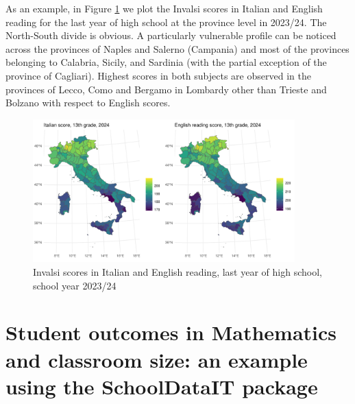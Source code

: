 \documentclass{book}
\begin{document}
As an example, in Figure \ref{fig:Invalsi} we plot the Invalsi scores in Italian and English reading for the last year of high school at the province level in 2023/24. The North-South divide is obvious. A particularly vulnerable profile can be noticed across the provinces of Naples and Salerno (Campania) and most of the provinces belonging to Calabria, Sicily, and Sardinia (with the partial exception of the province of Cagliari). Highest scores in both subjects are observed in the provinces of Lecco, Como and Bergamo in Lombardy other than Trieste and Bolzano with respect to English scores.

\begin{figure}
  \centering
  \includegraphics[width = 0.9\textwidth]{SchoolDataIT/Fig6.pdf} 
  \caption{Invalsi scores in Italian and English reading, last year of high school, school year 2023/24}
  \label{fig:Invalsi}
\end{figure}





\section{Student outcomes in Mathematics and classroom size: an example using the SchoolDataIT package} \label{section:Example}
\end{document}
